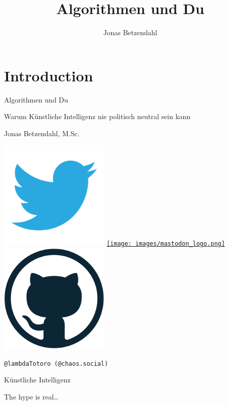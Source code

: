 \documentclass[aspectratio=43,x11names]{beamer}
\author{Jonas Betzendahl}
\title{Algorithmen und Du}
\begin{document}
\section{Introduction}

\begin{frame}
\begin{center}
\vfill
\huge Algorithmen und Du
\normalsize 
\smallskip
\smallskip

Warum Künstliche Intelligenz nie politisch neutral sein kann
\bigskip\bigskip

\large Jonas Betzendahl, M.Sc.
\bigskip\bigskip

\href{https://twitter.com/lambdatotoro}{\includegraphics[scale=0.125]{images/twitter_logo.png}}
\href{https://chaos.social/@lambdatotoro}{\texttt{[image: images/mastodon\_logo.png]}}
\href{https://github.com/lambdaTotoro}{\includegraphics[scale=0.125]{images/github_logo.png}}

\texttt{@lambdaTotoro (@chaos.social)}
\end{center}
\end{frame}



\begin{frame}
\begin{center}
\huge
Künstliche Intelligenz
\bigskip

\large
The hype is real\dots
\end{center}
\end{frame}
\end{document}
